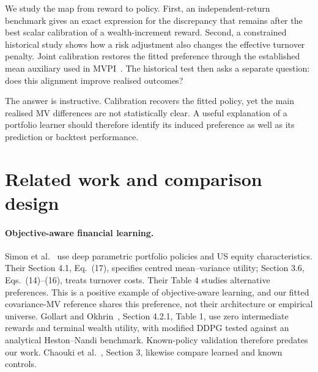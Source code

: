 \documentclass[sigconf,anonymous,review]{acmart}
\begin{document}
We study the map from reward to policy. First, an independent-return benchmark gives an exact expression for the discrepancy that remains after the best scalar calibration of a wealth-increment reward. Second, a constrained historical study shows how a risk adjustment also changes the effective turnover penalty. Joint calibration restores the fitted preference through the established mean auxiliary used in MVPI\ \cite{zhang2021}. The historical test then asks a separate question: does this alignment improve realised outcomes?

The answer is instructive. Calibration recovers the fitted policy, yet the main realised MV differences are not statistically clear. A useful explanation of a portfolio learner should therefore identify its induced preference as well as its prediction or backtest performance.

\section{Related work and comparison design}
\paragraph{Objective-aware financial learning.}
Simon et al.\ \cite{simon2026} use deep parametric portfolio policies and US equity characteristics. Their Section 4.1, Eq.\ (17), specifies centred mean--variance utility; Section 3.6, Eqs.\ (14)--(16), treats turnover costs. Their Table 4 studies alternative preferences. This is a positive example of objective-aware learning, and our fitted covariance-MV reference shares this preference, not their architecture or empirical universe. Gollart and Okhrin\ \cite{gollart2025}, Section 4.2.1, Table 1, use zero intermediate rewards and terminal wealth utility, with modified DDPG tested against an analytical Heston--Nandi benchmark. Known-policy validation therefore predates our work. Chaouki et al.\ \cite{chaouki2020}, Section 3, likewise compare learned and known controls.
\end{document}
